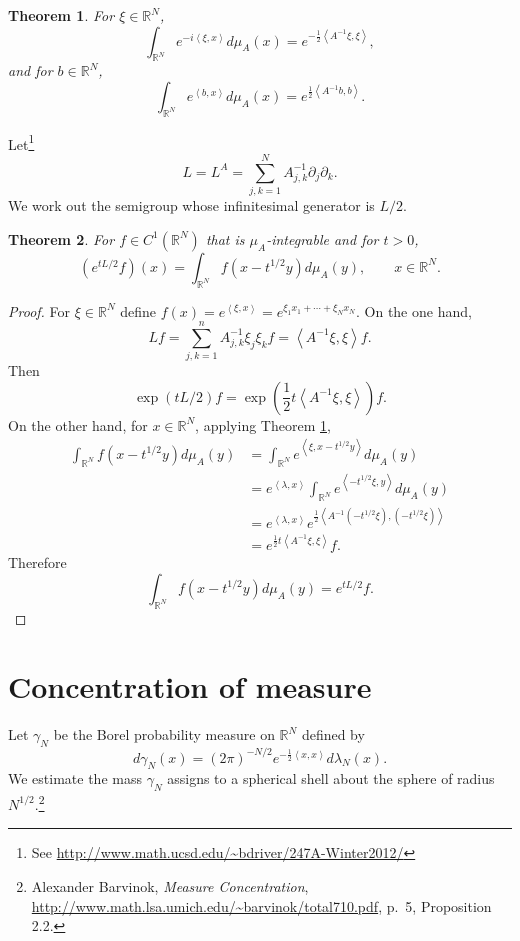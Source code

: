 \documentclass{article}
\newcommand{\inner}[2]{\left\langle #1, #2 \right\rangle}
\newtheorem{theorem}{Theorem}
\theoremstyle{definition}
\begin{document}
\begin{theorem}
For $\xi \in \mathbb{R}^N$,
\[
\int_{\mathbb{R}^N} e^{-i\inner{\xi}{x}} d\mu_A(x) = e^{-\frac{1}{2}\inner{A^{-1}\xi}{\xi}},
\]
and for $b \in \mathbb{R}^N$,
\[
\int_{\mathbb{R}^N} e^{\inner{b}{x}} d\mu_A(x) = e^{\frac{1}{2}\inner{A^{-1}b}{b}}.
\]
\label{gaussianRd}
\end{theorem}


Let\footnote{See \url{http://www.math.ucsd.edu/~bdriver/247A-Winter2012/}}
\[
L=L^A = \sum_{j,k=1}^N A_{j,k}^{-1} \partial_j \partial_k.
\]
We work out the semigroup whose infinitesimal generator is $L/2$.

\begin{theorem}
For $f \in C^1(\mathbb{R}^N)$ that is $\mu_A$-integrable and for $t>0$,
\[
(e^{t L/2} f)(x) = \int_{\mathbb{R}^N} f(x-t^{1/2} y) d\mu_A(y),
\qquad x \in \mathbb{R}^N.
\]
\end{theorem}
\begin{proof}
For $\xi \in \mathbb{R}^N$ define
 $f(x) = e^{\inner{\xi}{x}}=e^{\xi_1 x_1 + \cdots + \xi_N x_N}$. On the one hand,
\[
Lf=\sum_{j,k=1}^n A_{j,k}^{-1} \xi_j \xi_k f
= \inner{A^{-1}\xi}{\xi} f.
\]
Then
\[
\exp(tL/2) f = \exp\left( \frac{1}{2}t \inner{A^{-1}\xi}{\xi} \right) f.
\]
On the other hand, for $x \in \mathbb{R}^N$, applying Theorem \ref{gaussianRd},
\begin{align*}
\int_{\mathbb{R}^N} f(x-t^{1/2}y) d\mu_A(y)&=\int_{\mathbb{R}^N}
e^{\inner{\xi}{x-t^{1/2}y}} d\mu_A(y)\\
&=e^{\inner{\lambda}{x}} \int_{\mathbb{R}^N} e^{\inner{-t^{1/2}\xi}{y}} d\mu_A(y)\\
&=e^{\inner{\lambda}{x}} e^{\frac{1}{2}\inner{A^{-1} (-t^{1/2} \xi)}{(-t^{1/2}\xi)}}\\
&= e^{\frac{1}{2}t\inner{A^{-1}\xi}{\xi}} f.
\end{align*}
Therefore
\[
\int_{\mathbb{R}^N} f(x-t^{1/2}y) d\mu_A(y) = e^{tL/2} f.
\]
\end{proof}



\section{Concentration of measure}
Let $\gamma_N$ be the Borel probability measure on $\mathbb{R}^N$ defined by
\[
d\gamma_N(x) = (2\pi)^{-N/2} e^{-\frac{1}{2} \inner{x}{x}} d\lambda_N(x).
\]
We estimate the mass $\gamma_N$ assigns to a spherical shell about the sphere of radius $N^{1/2}$.\footnote{Alexander
Barvinok, {\em Measure Concentration}, \url{http://www.math.lsa.umich.edu/~barvinok/total710.pdf},
p.~5, Proposition 2.2.}
\end{document}
